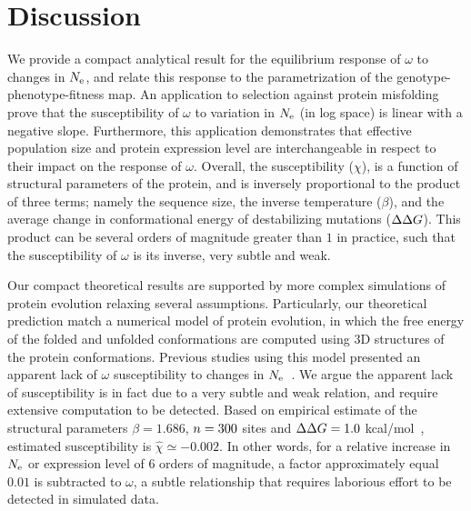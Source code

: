 \section{Discussion}

We provide a compact analytical result for the equilibrium response of $\omega$ to changes in $N_{\mathrm{e}}$, and relate this response to the parametrization of the genotype-phenotype-fitness map.
An application to selection against protein misfolding prove that the susceptibility of $\omega$ to variation in $N_{\mathrm{e}}$ (in log space) is linear with a negative slope.
Furthermore, this application demonstrates that effective population size and protein expression level are interchangeable in respect to their impact on the response of $\omega$.
Overall, the susceptibility ($\chi$), is a function of structural parameters of the protein, and is inversely proportional to the product of three terms;
namely the sequence size, the inverse temperature ($\beta$), and the average change in conformational energy of destabilizing mutations ($\Delta \Delta G$).
This product can be several orders of magnitude greater than $1$ in practice, such that the susceptibility of $\omega$ is its inverse, very subtle and weak.


Our compact theoretical results are supported by more complex simulations of protein evolution relaxing several assumptions.
Particularly, our theoretical prediction match a numerical model of protein evolution, in which the free energy of the folded and unfolded conformations are computed using $3$D structures of the protein conformations.
Previous studies using this model presented an apparent lack of $\omega$ susceptibility to changes in $N_{\mathrm{e}}$~\citep{Goldstein2013}.
We argue the apparent lack of susceptibility is in fact due to a very subtle and weak relation, and require extensive computation to be detected.
Based on empirical estimate of the structural parameters $\beta = 1.686$, $n=300$ sites and $\Delta \Delta G = 1.0$ kcal/mol~\citep{Zeldovich2007}, estimated susceptibility is $\hat{\chi} \simeq -0.002$.
In other words, for a relative increase in $N_{\mathrm{e}}$ or expression level of $6$ orders of magnitude, a factor approximately equal $0.01$ is subtracted to $\omega$, a subtle relationship that requires laborious effort to be detected in simulated data.

